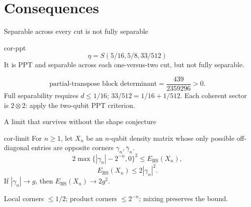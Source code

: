 \documentclass{beamer}
\begin{document}
\section{Consequences}
\begin{frame}{Separable across every cut is not fully separable}
\begin{bookresult}{cor-ppt}
\[
\eta=S(5/16,5/8,33/512)
\]
It is PPT and separable across each one-versus-two cut, but not fully separable.
\end{bookresult}
\[
\text{partial-transpose block determinant}=\frac{439}{2359296}>0.
\]
Full separability requires $d\le1/16$; $33/512=1/16+1/512$.
\medskip
Each coherent sector is $2\otimes2$: apply the two-qubit PPT criterion.
\end{frame}
\begin{frame}{A limit that survives without the shape conjecture}
\begin{bookresult}{cor-limit}
For $n\ge1$, let $X_n$ be an $n$-qubit density matrix whose only possible off-diagonal entries are opposite corners $\gamma_n,\bar\gamma_n$.
\[
2\max\{|\gamma_n|-2^{-n},0\}^2\le E_{\mathrm{HS}}(X_n),
\]
\[
E_{\mathrm{HS}}(X_n)\le2|\gamma_n|^2.
\]
If $|\gamma_n|\to g$, then $E_{\mathrm{HS}}(X_n)\to2g^2$.
\end{bookresult}
Local corners $\le1/2$; product corners $\le2^{-n}$; mixing preserves the bound.
\end{frame}
\end{document}
